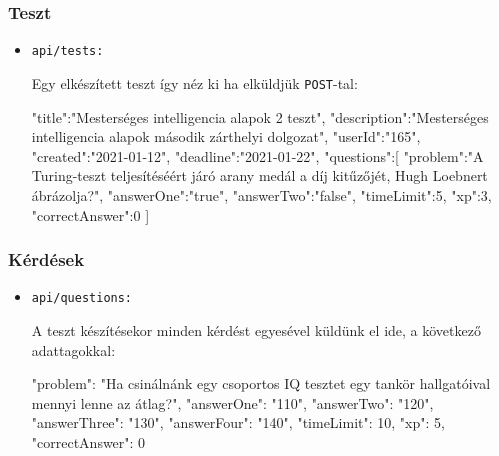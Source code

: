 \subsubsection{Teszt}
\begin{itemize}[label={$\bullet$}, topsep=0pt, itemsep=0pt, leftmargin=15pt]
    \item[] {\nolinkurl{api/tests:}}
          \begin{addmargin}[\parindent]{0pt}
              
              Egy elkészített teszt így néz ki ha elküldjük \nolinkurl{POST}-tal:
              \begin{json}
{
    "title":"Mesterséges intelligencia alapok 2 teszt",
    "description":"Mesterséges intelligencia alapok második zárthelyi dolgozat",
    "userId":"165",
    "created":"2021-01-12",
    "deadline":"2021-01-22",
    "questions":[
        {
            "problem":"A Turing-teszt teljesítéséért járó arany medál a díj kitűzőjét, Hugh Loebnert ábrázolja?",
            "answerOne":"true",
            "answerTwo":"false",
            "timeLimit":5,
            "xp":3,
            "correctAnswer":0
        }
    ]
}
              \end{json}
          \end{addmargin}
\end{itemize}

\subsubsection{Kérdések}
\begin{itemize}[label={$\bullet$}, topsep=0pt, itemsep=0pt, leftmargin=15pt]
    \item[] {\nolinkurl{api/questions:}}
          \begin{addmargin}[\parindent]{0pt}
              A teszt készítésekor minden kérdést egyesével küldünk el ide, a következő adattagokkal:
              \begin{json}
{
    "problem": "Ha csinálnánk egy csoportos IQ tesztet egy tankör hallgatóival mennyi lenne az átlag?",
    "answerOne": "110",
    "answerTwo": "120",
    "answerThree": "130",
    "answerFour": "140",
    "timeLimit": 10,
    "xp": 5,
    "correctAnswer": 0
}
              \end{json}
          \end{addmargin}
\end{itemize}

